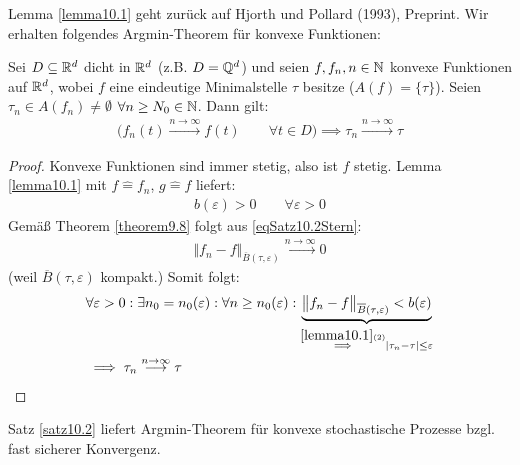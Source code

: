 
Lemma \ref{lemma10.1} geht zurück auf Hjorth und Pollard (1993), Preprint.
Wir erhalten folgendes Argmin-Theorem für konvexe Funktionen:

\begin{satz}\label{satz10.2}
	Sei $D\subseteq\mathbb{R}^d$ dicht in $\mathbb{R}^d$ (z.B. $D=\mathbb{Q}^d$) und seien $f,f_n,n\in\mathbb{N}$ konvexe Funktionen auf $\mathbb{R}^d$, wobei $f$ eine eindeutige Minimalstelle $\tau$ besitze ($A(f)=\lbrace\tau\rbrace$).
	Seien $\tau_n\in A(f_n)\neq\emptyset$ $\forall n\geq N_0\in\mathbb{N}$.
	Dann gilt:
	\begin{align}\label{eqSatz10.2Stern}\tag{$\ast$}
		\Big(f_n(t)\overset{n\to\infty}{\longrightarrow} f(t)\qquad\forall t\in D\Big)\implies \tau_n\overset{n\to\infty}{\longrightarrow}\tau
	\end{align}
\end{satz}

\begin{proof}
	Konvexe Funktionen sind immer stetig, also ist $f$ stetig.
	Lemma \ref{lemma10.1} mit $f\hat{=}f_n$, $g\hat{=}f$ liefert:
	\begin{align*}
		b(\varepsilon)>0\qquad\forall\varepsilon>0
	\end{align*}
	Gemäß Theorem \ref{theorem9.8} folgt aus \eqref{eqSatz10.2Stern}:
	\begin{align*}
		\big\Vert f_n-f\big\Vert_{\overline{B}(\tau,\varepsilon)}\overset{n\to\infty}{\longrightarrow}0
	\end{align*}
	(weil $\overline{B}(\tau,\varepsilon)$ kompakt.)
	Somit folgt:
	\begin{align*}
		&\forall\varepsilon>0:\exists n_0=n_0(\varepsilon):\forall n\geq n_0(\varepsilon):
		\underbrace{\big\Vert f_n-f\big\Vert_{\overline{B}(\tau,\varepsilon)}<b(\varepsilon)}_{\overset{\ref{lemma10.1}(2)}{\implies}|\tau_n-\tau|\leq\varepsilon}\\
		&\implies \tau_n\overset{n\to\infty}{\longrightarrow}\tau
	\end{align*}
\end{proof}

Satz \ref{satz10.2} liefert Argmin-Theorem für konvexe stochastische Prozesse bzgl. fast sicherer Konvergenz.

